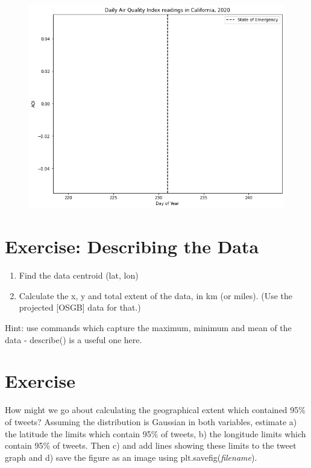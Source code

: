 \documentclass[
  letterpaper,
  DIV=11,
  numbers=noendperiod]{scrreprt}
\begin{document}
\begin{figure}[H]

{\centering \includegraphics{notebooks/W03. Spatial Data_files/figure-pdf/cell-15-output-2.png}

}

\end{figure}

\hypertarget{exercise-describing-the-data}{%
\section{Exercise: Describing the
Data}\label{exercise-describing-the-data}}

\begin{enumerate}
\def\labelenumi{\arabic{enumi})}
\item
  Find the data centroid (lat, lon)
\item
  Calculate the x, y and total extent of the data, in km (or miles).
  (Use the projected {[}OSGB{]} data for that.)
\end{enumerate}

Hint: use commands which capture the maximum, minimum and mean of the
data - describe() is a useful one here.

\hypertarget{exercise-8}{%
\section{Exercise}\label{exercise-8}}

How might we go about calculating the geographical extent which
contained 95\% of tweets? Assuming the distribution is Gaussian in both
variables, estimate a) the latitude the limits which contain 95\% of
tweets, b) the longitude limits which contain 95\% of tweets. Then c)
and add lines showing these limits to the tweet graph and d) save the
figure as an image using plt.savefig(\emph{filename}).
\end{document}
